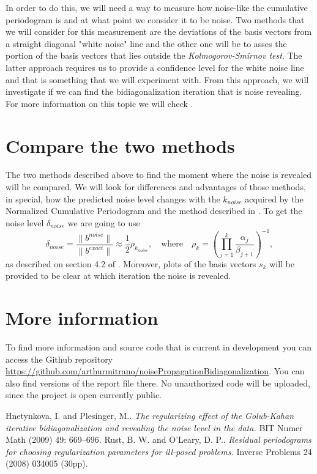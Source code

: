 \documentclass[11pt]{amsart}
\begin{document}
In order to do this, we will need a way to measure how noise-like the cumulative periodogram is and at
what point we consider it to be noise. Two methods that we will consider for this measurement are the
deviations of the basis vectors from a straight diagonal "white noise" line and the other one will be
to asses the portion of the basis vectors that lies outside the \emph{Kolmogorov-Smirnov test}. 
The latter approach requires us to provide a confidence level for the white noise line and that is
something that we will experiment with. From this approach, we will investigate if we can find the
bidiagonalization iteration that is noise revealing. For more information on this topic we will check
\cite{peridograms}.


\section{Compare the two methods}
The two methods described above to find the moment where the noise is revealed will be compared. We will look
for differences and advantages of those methods, in special, how the predicted noise level changes with the 
$k_{noise}$ acquired by the Normalized Cumulative Periodogram and the method described in \cite{bidiagonalization}.
To get the noise level $\delta_{noise}$ we are going to use 
\begin{equation*}
	\delta_{noise} = \frac{\|b^{noise}\|}{\|b^{exact}\|} \approx \frac{1}{2}\rho_{k_{noise}}, \quad \text{where}
	\quad \rho_{k} = \left(\prod_{j=1}^k\frac{\alpha_j}{\beta_{j+1}}\right)^{-1},
\end{equation*}
as described on section 4.2 of \cite{bidiagonalization}.
Moreover, plots of the basis vectors $s_k$ will be provided to be clear at which iteration the noise is
revealed.

\section{More information}
\begin{sloppypar}
To find more information and source code that is current in development you can access the Github repository
\url{https://github.com/arthurmitrano/noisePropagationBidiagonalization}. You can also find 
versions of the report file there. No unauthorized code will be uploaded, since the project is open currently
public.
\end{sloppypar}

\begin{thebibliography}{1}
	  Hnetynkova, I. and Plesinger, M..
		\emph{The regularizing effect of the Golub-Kahan iterative bidiagonalization and revealing the
             noise level in the data.}
		BIT Numer Math (2009) 49: 669–696.
	 Rust, B. W. and O'Leary, D. P.. 
		\emph{Residual periodograms for choosing regularization parameters for ill-posed problems.}
		Inverse Problems 24 (2008) 034005 (30pp).
\end{thebibliography}
\end{document}
